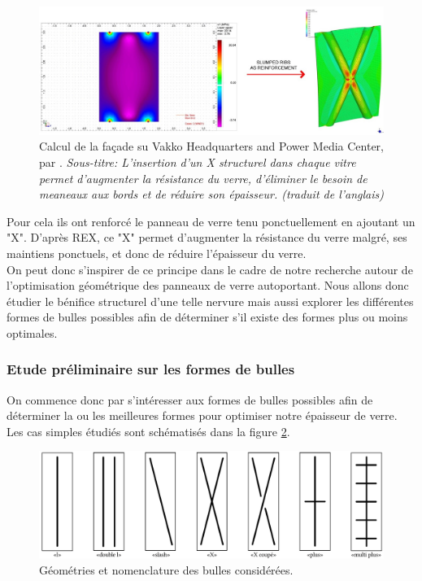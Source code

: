\documentclass[11pt,titlepage]{article}
\begin{document}
\begin{figure}[H]
    \centering
    \includegraphics[width=\linewidth]{img/bulle/stringio.jpg}
    \caption{Calcul de la façade su Vakko Headquarters and Power Media Center, par \cite{REX}. \textit{Sous-titre: L'insertion d'un X structurel dans chaque vitre permet d'augmenter la résistance du verre, d'éliminer le besoin de meaneaux aux bords et de réduire son épaisseur. (traduit de l'anglais)}}
    \label{fig:REXcalc}
\end{figure}

Pour cela ils ont renforcé le panneau de verre tenu ponctuellement en ajoutant un "X". D'après REX, ce "X" permet d'augmenter la résistance du verre malgré, ses maintiens ponctuels, et donc de réduire l'épaisseur du verre.
\\

On peut donc s'inspirer de ce principe dans le cadre de notre recherche autour de l'optimisation géométrique des panneaux de verre autoportant. Nous allons donc étudier le bénifice structurel d'une telle nervure mais aussi explorer les différentes formes de bulles possibles afin de déterminer s'il existe des formes plus ou moins optimales. 

\subsubsection{Etude préliminaire sur les formes de bulles}

On commence donc par s'intéresser aux formes de bulles possibles afin de déterminer la ou les meilleures formes pour optimiser notre épaisseur de verre. Les cas simples étudiés sont schématisés dans la figure \ref{fig:types_bulle}. 

\begin{figure}[H]
    \centering
    \includegraphics[width=\linewidth]{img/bulle/types_bulles.pdf}
    \caption{Géométries et nomenclature des bulles considérées.}
    \label{fig:types_bulle}
\end{figure}
\end{document}
